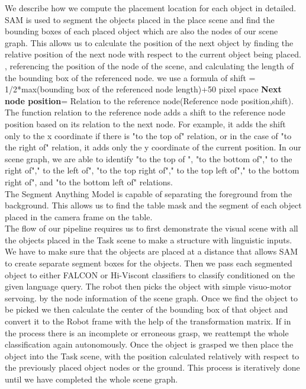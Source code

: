 We describe how we compute the placement location for each object in detailed.
SAM is used to segment the objects placed in the place scene and find the bounding boxes of each placed object which are also the nodes of our scene graph.
This allows us to calculate the position of the next object by finding the relative position of the next node with respect to the current object being placed.
, referencing the position of the node of the scene, and calculating the length of the bounding box of the referenced node. 
we use a formula of shift = 1/2*max(bounding box of the referenced node length)+50 pixel space \textbf{Next node position}= Relation to the reference node(Reference node position,shift). The function relation to the reference node adds a shift to the reference node position based on its relation to the next node. For example, it adds the shift only to the x coordinate if there is "to the top of" relation, or in the case of "to the right of" relation, it adds only the y coordinate of the current position. In our scene graph, we are able to identify "to the top of ", "to the bottom of"," to the right of"," to the left of", "to the top right of"," to the top left of"," to the bottom right of", and "to the bottom left of" relations.\\
The Segment Anything Model is capable of separating the foreground from the background. This allows us to find the table mask and the segment of each object placed in the camera frame on the table. \\
The flow of our pipeline requires us to first demonstrate the visual scene with all the objects placed in the Task scene to make a structure with linguistic inputs. 
We have to make sure that the objects are placed at a distance that allows SAM to create separate segment boxes for the objects. Then we pass each segmented object to either FALCON or Hi-Viscont classifiers to classify conditioned on the given language query. The robot then picks the object with simple visuo-motor servoing. 
by the node information of the scene graph. 
Once we find the object to be picked we then calculate the center of the bounding box of that object and convert it to the Robot frame with the help of the transformation matrix. 
If in the process there is an incomplete or erroneous grasp, we reattempt the whole classification again autonomously. Once the object is grasped we then place the object into the Task scene, with the position calculated relatively 
with respect to the previously placed object nodes or the ground. This process is iteratively done until we have completed the whole scene graph.

